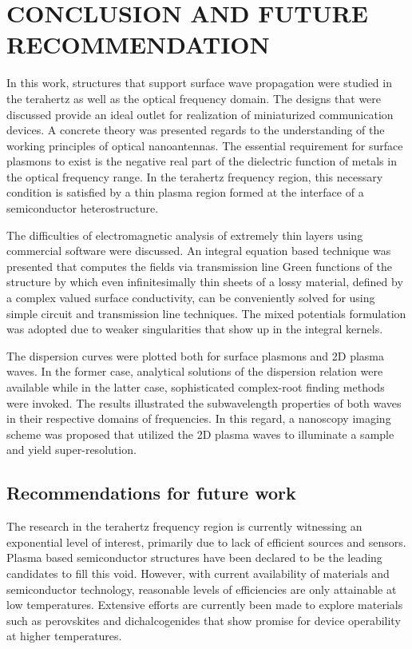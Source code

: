 \chapter{\uppercase {Conclusion and Future recommendation}}

In this work, structures that support surface wave propagation were studied in the terahertz as well as the  optical frequency domain. The designs that were discussed provide an ideal outlet for realization of miniaturized communication devices. A concrete theory was presented regards to the understanding of the working principles of optical nanoantennas. The essential requirement for surface plasmons to exist is the negative real part of the dielectric function of metals in the optical frequency range. In the terahertz frequency region, this necessary condition is satisfied by a thin plasma region formed at the interface of a semiconductor heterostructure.

The difficulties of electromagnetic analysis of extremely thin layers using commercial software were discussed. An integral equation based technique was presented that computes the fields via transmission line Green functions of the structure by which even infinitesimally thin sheets of a lossy material, defined by a complex valued surface conductivity, can be conveniently solved for using simple circuit and transmission line techniques. The mixed potentials formulation was adopted due to weaker singularities that show up in the integral kernels.

The dispersion curves were plotted both for surface plasmons and 2D plasma waves. In the former case, analytical solutions of the dispersion relation were available while in the latter case, sophisticated complex-root finding methods were invoked. The results illustrated the subwavelength properties of both waves in their respective domains of frequencies. In this regard, a nanoscopy  imaging scheme was proposed that utilized the 2D plasma waves to illuminate a sample and yield super-resolution.

\section*{Recommendations for future work}
%
%
The research in the terahertz frequency region is currently witnessing an exponential level of interest, primarily due to lack of efficient sources and sensors. Plasma based semiconductor structures have been declared to be the leading candidates to fill this void. However, with current availability of materials and semiconductor technology, reasonable levels of efficiencies are only attainable at low temperatures. Extensive efforts are currently been made to explore materials such as perovskites and dichalcogenides that show promise for device operability at higher temperatures.

